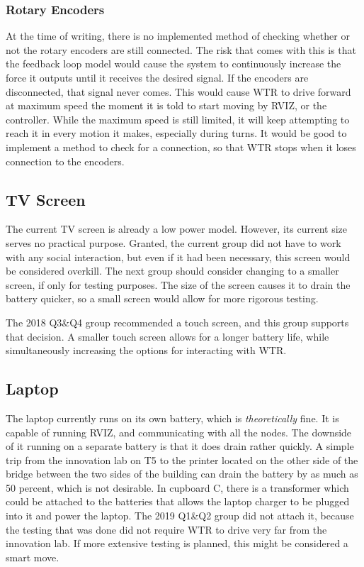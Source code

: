 \subsubsection{Rotary Encoders}
At the time of writing, there is no implemented method of checking whether or not the rotary encoders are still connected.
The risk that comes with this is that the feedback loop model would cause the system to continuously increase the force it outputs until it receives the desired signal.
If the encoders are disconnected, that signal never comes.
This would cause WTR to drive forward at maximum speed the moment it is told to start moving by RVIZ, or the controller.
While the maximum speed is still limited, it will keep attempting to reach it in every motion it makes, especially during turns.
It would be good to implement a method to check for a connection, so that WTR stops when it loses connection to the encoders.

\subsection{TV Screen}
The current TV screen is already a low power model.
However, its current size serves no practical purpose.
Granted, the current group did not have to work with any social interaction, but even if it had been necessary, this screen would be considered overkill.
The next group should consider changing to a smaller screen, if only for testing purposes.
The size of the screen causes it to drain the battery quicker, so a small screen would allow for more rigorous testing.

The 2018 Q3\&Q4 group recommended a touch screen, and this group supports that decision.
A smaller touch screen allows for a longer battery life, while simultaneously increasing the options for interacting with WTR.

\subsection{Laptop}
The laptop currently runs on its own battery, which is \textit{theoretically} fine.
It is capable of running RVIZ, and communicating with all the nodes.
The downside of it running on a separate battery is that it does drain rather quickly.
A simple trip from the innovation lab on T5 to the printer located on the other side of the bridge between the two sides of the building can drain the battery by as much as 50 percent, which is not desirable.
In cupboard C, there is a transformer which could be attached to the batteries that allows the laptop charger to be plugged into it and power the laptop.
The 2019 Q1\&Q2 group did not attach it, because the testing that was done did not require WTR to drive very far from the innovation lab.
If more extensive testing is planned, this might be considered a smart move.

